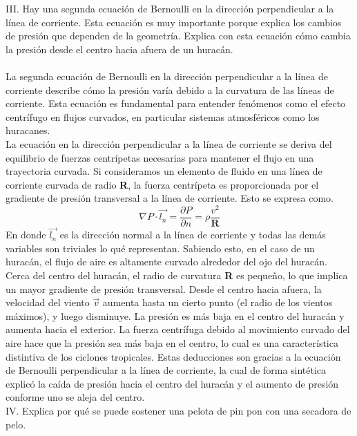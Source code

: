 \documentclass{article}
\begin{document}
\noindent III. Hay una segunda ecuación de Bernoulli en la dirección perpendicular a la línea de corriente. Esta ecuación es muy importante porque explica los cambios de presión que dependen de la geometría. Explica con esta ecuación cómo cambia la presión desde el centro hacia afuera de un huracán. \\\\
La segunda ecuación de Bernoulli en la dirección perpendicular a la línea de corriente describe cómo la presión varía debido a la curvatura de las líneas de corriente. Esta ecuación es fundamental para entender fenómenos como el efecto centrífugo en flujos curvados, en particular sistemas atmosféricos como los huracanes. \\
La ecuación en la dirección perpendicular a la línea de corriente se deriva del equilibrio de fuerzas centrípetas necesarias para mantener el flujo en una trayectoria curvada. Si consideramos un elemento de fluido en una línea de corriente curvada de radio \textbf{R}, la fuerza centrípeta es proporcionada por el gradiente de presión transversal a la línea de corriente. Esto se expresa como.
\begin{equation}
    \nabla P \cdot \Vec{l_n} = \frac{\partial P}{\partial n} = \rho \frac{v^2}{\textbf{R}}
\end{equation}
En donde $\Vec{l_n}$ es la dirección normal a la línea de corriente y todas las demás variables son triviales lo qué representan. Sabiendo esto, en el caso de un huracán, el flujo de aire es altamente curvado alrededor del ojo del huracán. \\
Cerca del centro del huracán, el radio de curvatura \textbf{R} es pequeño, lo que implica un mayor gradiente de presión transversal. Desde el centro hacia afuera, la velocidad del viento $\Vec{v}$ aumenta hasta un cierto punto (el radio de los vientos máximos), y luego disminuye. La presión es más baja en el centro del huracán y aumenta hacia el exterior. La fuerza centrífuga debido al movimiento curvado del aire hace que la presión sea más baja en el centro, lo cual es una característica distintiva de los ciclones tropicales. Estas deducciones son gracias a la ecuación de Bernoulli perpendicular a la línea de corriente, la cual de forma sintética explicó la caída de presión hacia el centro del huracán y el aumento de presión conforme uno se aleja del centro. \\

\noindent IV. Explica por qué se puede sostener una pelota de pin pon con una secadora de pelo. \\\\
\end{document}
